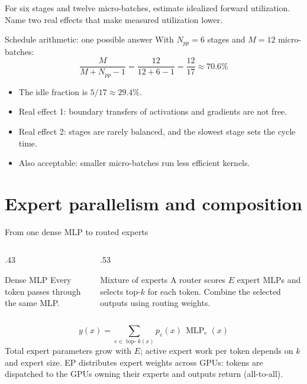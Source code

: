 \documentclass[handout]{beamer}
\begin{document}
{For six stages and twelve micro-batches, estimate idealized forward utilization. Name two real effects that make measured utilization lower.}

\begin{frame}{Schedule arithmetic: one possible answer}
  With $N_{pp}=6$ stages and $M=12$ micro-batches:
  \[
    \frac{M}{M+N_{pp}-1}=\frac{12}{12+6-1}=\frac{12}{17}\approx70.6\%
  \]
  \begin{itemize}
      \setlength{\itemsep}{8pt}
    \item The idle fraction is $5/17\approx29.4\%$.
    \item Real effect 1: boundary transfers of activations and gradients are not free.
    \item Real effect 2: stages are rarely balanced, and the slowest stage sets the cycle time.
    \item Also acceptable: smaller micro-batches run less efficient kernels.
  \end{itemize}
\end{frame}

\section{Expert parallelism and composition}

\begin{frame}{From one dense MLP to routed experts}
  \begin{columns}[c]
    \begin{column}{.43\linewidth}
      \begin{block}{Dense MLP}
        Every token passes through the same MLP.
      \end{block}
    \end{column}
    \begin{column}{.53\linewidth}
      \begin{block}{Mixture of experts}
        A router scores $E$ expert MLPs and selects top-$k$ for each token. Combine the selected outputs using routing weights.
      \end{block}
    \end{column}
  \end{columns}
  \[
    y(x)=\sum_{e\in\operatorname{top-}k(x)}p_e(x)\,\operatorname{MLP}_e(x)
  \]
  \small Total expert parameters grow with $E$; active expert work per token depends on $k$ and expert size. EP distributes expert weights across GPUs: tokens are dispatched to the GPUs owning their experts and outputs return (all-to-all).
\end{frame}
\end{document}
